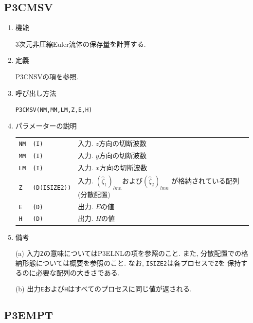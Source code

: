 \documentclass[a4j,fleqn]{jarticle}
\begin{document}

\subsection{P3CMSV}

\begin{enumerate}

\item 機能

3次元非圧縮Euler流体の保存量を計算する.

\item 定義

P3CNSVの項を参照.

\item 呼び出し方法

{\tt P3CMSV(NM,MM,LM,Z,E,H)}
  
\item パラメーターの説明

\begin{tabular}{lll}
{\tt NM} & {\tt (I)} & 入力. $z$方向の切断波数\\
{\tt MM} & {\tt (I)} & 入力. $y$方向の切断波数\\
{\tt LM} & {\tt (I)} & 入力. $x$方向の切断波数\\
{\tt Z} & {\tt (D(ISIZE2))} &
 入力. $(\hat{\zeta}_1)_{lmn}$および$(\hat{\zeta}_2)_{lmn}$
  が格納されている配列(分散配置)\\
{\tt E} & {\tt (D)} & 出力. $E$の値\\
{\tt H} & {\tt (D)} & 出力. $H$の値
\end{tabular}

\item 備考

(a) 入力{\tt Z}の意味についてはP3ELNLの項を参照のこと.
    また, 分散配置での格納形態については概要を参照のこと.
    なお, {\tt ISIZE2}は各プロセスで{\tt Z}を
    保持するのに必要な配列の大きさである.
    
(b) 出力{\tt E}および{\tt H}はすべてのプロセスに同じ値が返される.

\end{enumerate}


\subsection{P3EMPT}
\end{document}
